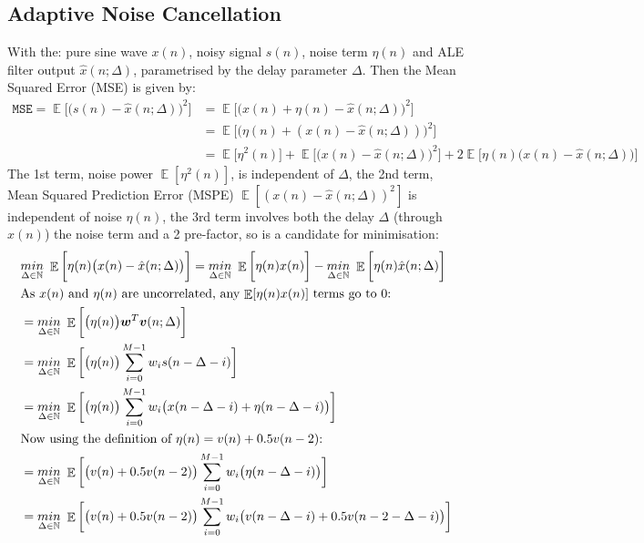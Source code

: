 \documentclass[12pt]{article}
\numberwithin{equation}{section}
\DeclareMathOperator*{\E}{\mathbb{E}}
\def\vw{{\bm{w}}}
\def\vv{{\bm{v}}}
\def\setNatural{{\mathbb{N}}}
\begin{document}
	\subsection{Adaptive Noise Cancellation} \label{sec: 2-3-ANC}
		With the: pure sine wave $x(n)$, noisy signal $s(n)$,  noise term $\eta(n)$ and ALE filter output $\hat{x}(n; \Delta)$, parametrised by the delay parameter $\Delta$.
		Then the Mean Squared Error (MSE) is given by:
		\begin{align}
		\mathtt{MSE} =
		\E \bigg[ \big( s(n) - \hat{x}(n; \Delta) \big)^{2} \bigg]  &=  \E \bigg[ \big( x(n) + \eta(n) - \hat{x}(n; \Delta) \big)^{2} \bigg] \\
		&=  \E \bigg[ \big( \eta(n) + (x(n) - \hat{x}(n; \Delta)) \big)^{2} \bigg] \\
		&=  \E \bigg[ \eta^{2}(n) \bigg] +
		\E \bigg[ \big( x(n) - \hat{x}(n; \Delta) \big)^{2} \bigg] +
		2\E \bigg[ \eta(n) \big(x(n) - \hat{x}(n; \Delta) \big) \bigg]
		\label{eq: 2-3a-ale_mse}
		\end{align}
		\noindent
		The 1st term, noise power $\E [ \eta^{2}(n) ]$, is independent of $\Delta$, the 2nd term, Mean Squared Prediction Error (MSPE) $\E [ (x(n) - \hat{x}(n; \Delta))^{2} ]$ is independent of noise $\eta(n)$, the 3rd term involves both the delay $\Delta$ (through $\hat{x}(n)$) the noise term and a 2 pre-factor, so is a candidate for minimisation:
		\begin{align}
		&\underset{\Delta \in \setNatural}{min}\ \E \bigg[ \eta(n) \big(x(n) - \hat{x}(n; \Delta) \big) \bigg] = \underset{\Delta \in \setNatural}{min}\ \E \bigg[ \eta(n) x(n) \bigg]- \underset{\Delta \in \setNatural}{min}\ \E \bigg[ \eta(n)\hat{x}(n; \Delta) \bigg] \\
		&\textnormal{As $x(n)$ and $\eta(n)$ are uncorrelated, any  $\E [ \eta(n) x(n) ]$ terms go to $0$:} \nonumber\\
		&=
		\underset{\Delta \in \setNatural}{min}\ \E \bigg[ \big( \eta(n) \big) \vw^{T} \vv(n; \Delta) \bigg] \\
		&=
		\underset{\Delta \in \setNatural}{min}\ \E \bigg[ \big( \eta(n) \big) \sum_{i=0}^{M-1} w_{i} s(n - \Delta - i) \bigg] \\
		&=
		\underset{\Delta \in \setNatural}{min}\ \E \bigg[ \big( \eta(n) \big) \sum_{i=0}^{M-1} w_{i} \big( x(n - \Delta - i) + \eta(n - \Delta - i) \big) \bigg] \\
		&\textnormal{Now using the definition of $\eta(n) = v(n) + 0.5v(n - 2)$:} \nonumber\\
		&=
		\underset{\Delta \in \setNatural}{min}\ \E \bigg[ \big( v(n) + 0.5v(n-2) \big) \sum_{i=0}^{M-1} w_{i} \big( \eta(n - \Delta - i) \big) \bigg] \\
		&=
		\underset{\Delta \in \setNatural}{min}\ \E \bigg[ \big( v(n) + 0.5v(n-2) \big) \sum_{i=0}^{M-1} w_{i} \big( v(n - \Delta - i) + 0.5 v(n - 2 - \Delta - i) \big) \bigg]
		\label{eq: 2-3a-choose-delta} 
		\end{align}
\end{document}
